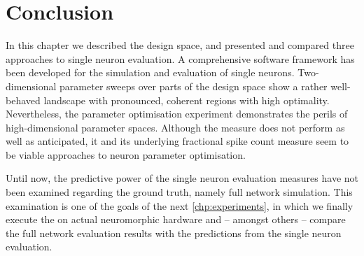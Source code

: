 \section{Conclusion}
In this chapter we described the design space, and presented and compared three approaches to single neuron evaluation. A comprehensive software framework has been developed for the simulation and evaluation of single neurons. Two-dimensional parameter sweeps over parts of the design space show a rather well-behaved landscape with pronounced, coherent regions with high optimality. Nevertheless, the parameter optimisation experiment demonstrates the perils of high-dimensional parameter spaces. Although the \SGMO measure does not perform as well as anticipated, it and its underlying fractional spike count measure seem to be viable approaches to neuron parameter optimisation.

Until now, the predictive power of the single neuron evaluation measures have not been examined regarding the ground truth, namely full network simulation. This examination is one of the goals of the next \cref{chp:experiments}, in which we finally execute the \BiNAM on actual neuromorphic hardware and -- amongst others -- compare the full network evaluation results with the predictions from the single neuron evaluation.
